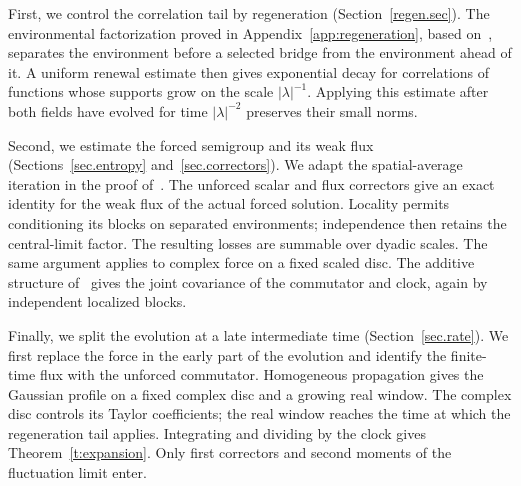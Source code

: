 \documentclass[11pt]{amsart}
\theoremstyle{definition}
\theoremstyle{remark}
\numberwithin{equation}{section}
\begin{document}
First, we control the correlation tail by regeneration (Section~\ref{regen.sec}). The environmental factorization proved in Appendix~\ref{app:regeneration}, based on~\citet[Proposition~5.4]{Einstein2012gantert}, separates the environment before a selected bridge from the environment ahead of it. A uniform renewal estimate then gives exponential decay for correlations of functions whose supports grow on the scale $|\lambda|^{-1}$. Applying this estimate after both fields have evolved for time $|\lambda|^{-2}$ preserves their small norms.

Second, we estimate the forced semigroup and its weak flux (Sections~\ref{sec.entropy} and~\ref{sec.correctors}). We adapt the spatial-average iteration in the proof of~\citet*[Theorem~9.1]{AKM2019book}. The unforced scalar and flux correctors give an exact identity for the weak flux of the actual forced solution. Locality permits conditioning its blocks on separated environments; independence then retains the central-limit factor. The resulting losses are summable over dyadic scales. The same argument applies to complex force on a fixed scaled disc. The additive structure of~\citet[Theorem~4.6]{AKM2019book} gives the joint covariance of the commutator and clock, again by independent localized blocks.

Finally, we split the evolution at a late intermediate time (Section~\ref{sec.rate}). We first replace the force in the early part of the evolution and identify the finite-time flux with the unforced commutator. Homogeneous propagation gives the Gaussian profile on a fixed complex disc and a growing real window. The complex disc controls its Taylor coefficients; the real window reaches the time at which the regeneration tail applies. Integrating and dividing by the clock gives Theorem~\ref{t:expansion}. Only first correctors and second moments of the fluctuation limit enter.

\begin{center}
\end{center}
\end{document}
